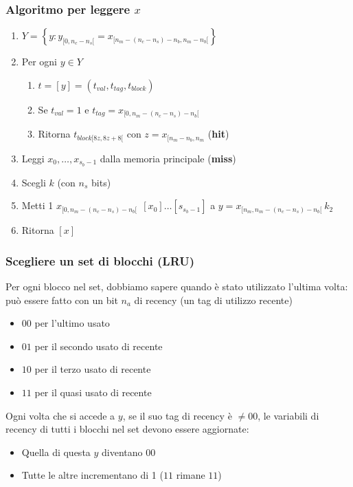 \documentclass[12pt,a4paper]{article}
\begin{document}
\subsubsection{Algoritmo per leggere $x$}
\begin{enumerate}
\item $Y=\left\{y:y_{[0,n_c-n_s[} = x_{[n_m-(n_c-n_s)-n_b,n_m-n_b[}\right\}$
\item Per ogni $y \in Y$
\begin{enumerate}
\item $t= [y]=(t_{val}, t_{tag}, t_{block})$
\item Se $t_{val} =1$ e $t_{tag} = x_{[0,n_m-(n_c-n_s)-n_b[}$
\item Ritorna $t_{block[8z,8z+8[}$ con $z=x_{[n_m-n_b, n_m}$ (\textbf{hit})
\end{enumerate}
\item Leggi $x_0, \dots, x_{s_b-1}$ dalla memoria principale (\textbf{miss})
\item Scegli $k$ (con $n_s$ bits)
\item Metti 1 $x_{[0,n_m-(n_c-n_s)-n_b[}\ \ [x_0] \dots [s_{s_b-1}]$ a $y=x_{[n_m, n_m - (n_c-n_s)-n_b[} \ k_2$
\item Ritorna $[x]$
\end{enumerate}

\subsubsection{Scegliere un set di blocchi (LRU)}
Per ogni blocco nel set, dobbiamo sapere quando è stato utilizzato l'ultima volta: può essere fatto con un bit $n_a$ di recency (un tag di utilizzo recente)
\begin{itemize}
\item $00$ per l'ultimo usato
\item $01$ per il secondo usato di recente
\item $10$ per il terzo usato di recente
\item $11$ per il quasi usato di recente
\end{itemize}
Ogni volta che si accede a $y$, se il suo tag di recency è $\not = 00$, le variabili di recency di tutti i blocchi nel set devono essere aggiornate:
\begin{itemize}
\item Quella di questa $y$ diventano 00
\item Tutte le altre incrementano di 1 ($11$ rimane $11$)
\end{itemize}
\end{document}
